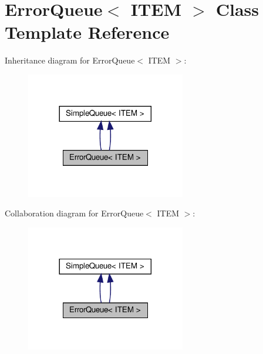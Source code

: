 \hypertarget{classErrorQueue}{}\section{Error\+Queue$<$ I\+T\+EM $>$ Class Template Reference}
\label{classErrorQueue}


Inheritance diagram for Error\+Queue$<$ I\+T\+EM $>$\+:\nopagebreak
\begin{figure}[H]
\begin{center}
\leavevmode
\includegraphics[width=197pt]{classErrorQueue__inherit__graph}
\end{center}
\end{figure}


Collaboration diagram for Error\+Queue$<$ I\+T\+EM $>$\+:\nopagebreak
\begin{figure}[H]
\begin{center}
\leavevmode
\includegraphics[width=197pt]{classErrorQueue__coll__graph}
\end{center}
\end{figure}
